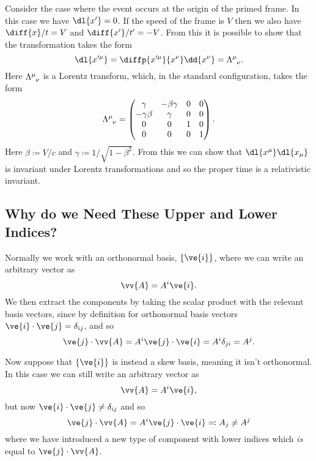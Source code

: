 \documentclass[fleqn]{NotesClass}
\begin{document}
    Consider the case where the event occurs at the origin of the primed frame.
    In this case we have \(\dl{x'} = 0\).
    If the speed of the frame is \(V\) then we also have \(\diff{x}/{t} = V\) and \(\diff{x'}/{t'} = -V\).
    From this it is possible to show that the transformation takes the form
    \begin{equation}
        \dl{x'^\mu} = \diffp{x'^\mu}{x^\nu} \dd{x^\nu} = \tensor{\Lambda}{^\mu_\nu}.
    \end{equation}
    Here \(\tensor{\Lambda}{^\mu_\nu}\) is a Lorentz transform, which, in the standard configuration, takes the form
    \begin{equation}
        \tensor{\Lambda}{^\mu_\nu} = 
        \begin{pmatrix}
            \gamma & -\beta\gamma & 0 & 0\\
            -\gamma\beta & \gamma & 0 & 0\\
            0 & 0 & 1 & 0\\
            0 & 0 & 0 & 1
        \end{pmatrix}
        .
    \end{equation}
    Here \(\beta \coloneqq V/c\) and \(\gamma \coloneqq 1/\sqrt{1 - \beta^2}\).
    From this we can show that \(\dl{x^\mu}\dl{x_\mu}\) is invariant under Lorentz transformations and so the proper time is a relativistic invariant.
    
    \subsection{Why do we Need These Upper and Lower Indices?}
    Normally we work with an orthonormal basis, \(\{\ve{i}\}\), where we can write an arbitrary vector as
    \begin{equation}
        \vv{A} = A^i\ve{i}.
    \end{equation}
    We then extract the components by taking the scalar product with the relevant basis vectors, since by definition for orthonormal basis vectors \(\ve{i} \cdot \ve{j} = \delta_{ij}\), and so
    \begin{equation}
        \ve{j} \cdot \vv{A} = A^i \ve{j} \cdot \ve{i} = A^i\delta_{ji} = A^j.
    \end{equation}
    
    Now suppose that \(\{\ve{i}\}\) is instead a skew basis, meaning it isn't orthonormal.
    In this case we can still write an arbitrary vector as
    \begin{equation}
        \vv{A} = A^i\ve{i},
    \end{equation}
    but now \(\ve{i} \cdot \ve{j} \ne \delta_{ij}\) and so
    \begin{equation}
        \ve{j} \cdot \vv{A} = A^i\ve{j} \cdot \ve{i} \eqqcolon A_j \ne A^j
    \end{equation}
    where we have introduced a new type of component with lower indices which \emph{is} equal to \(\ve{j} \cdot \vv{A}\).
    
\end{document}
